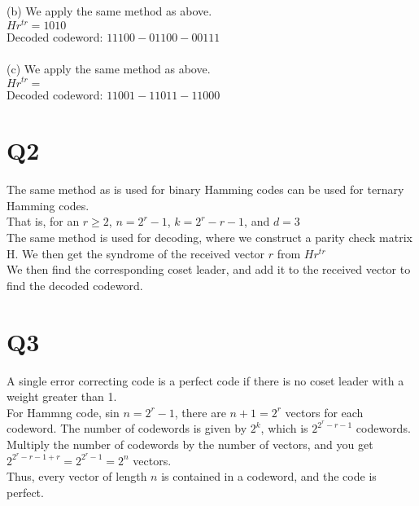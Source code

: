 \documentclass{article}
\begin{document}
(b) We apply the same method as above.\\
$Hr^{tr} = 1010$\\
Decoded codeword: $11100-01100-00111$\\\\

(c) We apply the same method as above.\\
$Hr^{tr} = $\\
Decoded codeword: $11001-11011-11000$

\section{Q2}
The same method as is used for binary Hamming codes can be used for ternary Hamming codes.\\
That is, for an $r \geq 2$, $n = 2^r -1$, $k = 2^r -r -1$, and $d = 3$\\
The same method is used for decoding, where we construct a parity check matrix H. We then get the syndrome of the received vector $r$ from $Hr^{tr}$\\
We then find the corresponding coset leader, and add it to the received vector to find the decoded codeword.

\section{Q3}
A single error correcting code is a perfect code if there is no coset leader with a weight greater than 1.\\
For Hammng code, sin $n = 2^r -1$, there are $n+1=2^r$ vectors for each codeword. The number of codewords is given by $2^k$, which is $2^{2^r -r -1}$ codewords.\\
Multiply the number of codewords by the number of vectors, and you get $ 2^{2^r - r - 1 + r} = 2^{2^r -1} = 2^n$ vectors.\\
Thus, every vector of length $n$ is contained in a codeword, and the code is perfect.
\end{document}
